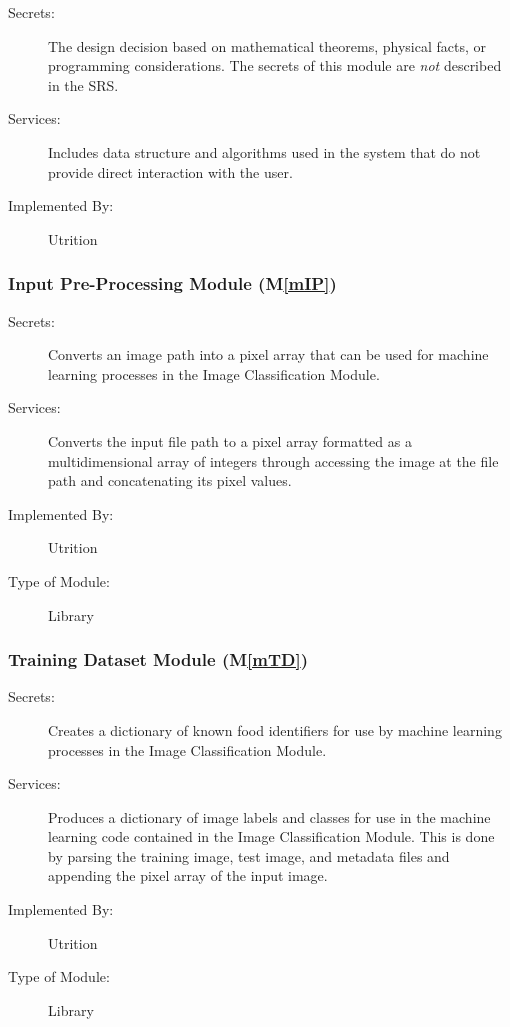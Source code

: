 \documentclass[12pt, titlepage]{article}
\newcommand{\mref}[1]{M\ref{#1}}
\begin{document}
\begin{description}
\item[Secrets:] The design decision based on mathematical theorems, physical
  facts, or programming considerations. The secrets of this module are
  \emph{not} described in the SRS.
\item[Services:] Includes data structure and algorithms used in the system that
  do not provide direct interaction with the user. 
\item[Implemented By:] Utrition
\end{description}

\subsubsection{Input Pre-Processing Module (\mref{mIP})}

\begin{description}
	\item[Secrets:] Converts an image path into a pixel array that can be used for machine learning processes in the Image Classification Module.
	\item[Services:] Converts the input file path to a pixel array formatted as a multidimensional array of integers through accessing the image at the file path and concatenating its pixel values.
	\item[Implemented By:] Utrition
	\item[Type of Module:] Library
\end{description}

\subsubsection{Training Dataset Module (\mref{mTD})}

\begin{description}
	\item[Secrets:] Creates a dictionary of known food identifiers for use by machine learning processes in the Image Classification Module.
	\item[Services:] Produces a dictionary of image labels and classes for use in the machine learning code contained in the Image Classification Module. This is done by parsing the training image, test image, and metadata files and appending the pixel array of the input image.
	\item[Implemented By:] Utrition
	\item[Type of Module:] Library
\end{description}
\end{document}
